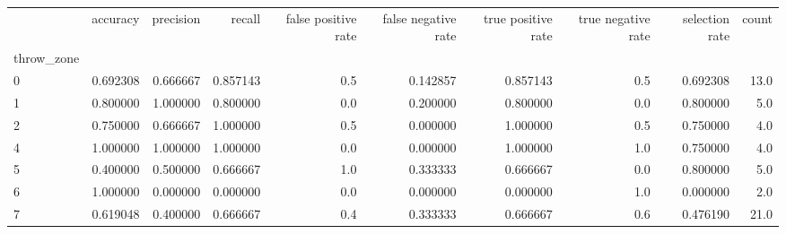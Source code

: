 \begin{tabular}{lrrrrrrrrr}
\toprule
{} &  accuracy &  precision &    recall &  false positive rate &  false negative rate &  true positive rate &  true negative rate &  selection rate &  count \\
throw\_zone &           &            &           &                      &                      &                     &                     &                 &        \\
\midrule
0          &  0.692308 &   0.666667 &  0.857143 &                  0.5 &             0.142857 &            0.857143 &                 0.5 &        0.692308 &   13.0 \\
1          &  0.800000 &   1.000000 &  0.800000 &                  0.0 &             0.200000 &            0.800000 &                 0.0 &        0.800000 &    5.0 \\
2          &  0.750000 &   0.666667 &  1.000000 &                  0.5 &             0.000000 &            1.000000 &                 0.5 &        0.750000 &    4.0 \\
4          &  1.000000 &   1.000000 &  1.000000 &                  0.0 &             0.000000 &            1.000000 &                 1.0 &        0.750000 &    4.0 \\
5          &  0.400000 &   0.500000 &  0.666667 &                  1.0 &             0.333333 &            0.666667 &                 0.0 &        0.800000 &    5.0 \\
6          &  1.000000 &   0.000000 &  0.000000 &                  0.0 &             0.000000 &            0.000000 &                 1.0 &        0.000000 &    2.0 \\
7          &  0.619048 &   0.400000 &  0.666667 &                  0.4 &             0.333333 &            0.666667 &                 0.6 &        0.476190 &   21.0 \\
\bottomrule
\end{tabular}
